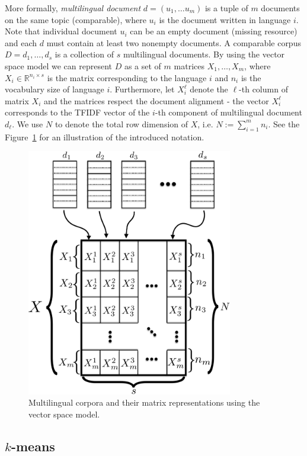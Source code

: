 \documentclass[twoside,11pt]{article}
\newcommand{\RR}{\mathbb{R}}
\begin{document}
More formally, \emph{multilingual document} $d = (u_1,\ldots u_m)$ is a tuple of $m$ documents on the same topic (comparable), where $u_i$ is the document written in language $i$. Note that individual document $u_i$ can be an empty document (missing resource) and each $d$ must contain at least two nonempty documents. A comparable corpus $D = {d_1, \ldots, d_s}$ is a collection of $s$ multilingual documents. By using the vector space model we can represent $D$ as a set of $m$ matrices $X_1,\ldots,X_m$, where $X_i \in \RR^{n_i \times s}$ is the matrix corresponding to the language $i$ and $n_i$ is the vocabulary size of language $i$. Furthermore, let $X_i^{\ell}$ denote the $\ell$-th column of matrix $X_i$ and the matrices respect the document alignment - the vector $X_i^\ell$ corresponds to the TFIDF vector of the $i$-th component of multilingual document $d_\ell$. We use $N$ to denote the total row dimension of $X$, i.e. $N:= \sum_{i=1}^m n_i$. See the Figure~\ref{fig:stacked_matrices} for an illustration of the introduced notation.

\begin{figure}[tbp]
\centering
\includegraphics[width=9cm]{stacked_matrices.pdf}
\caption{\label{fig:stacked_matrices} Multilingual corpora and their matrix representations using the vector space model.}
\end{figure}


\subsection{$k$-means}\label{sec:kmeans}
\end{document}
